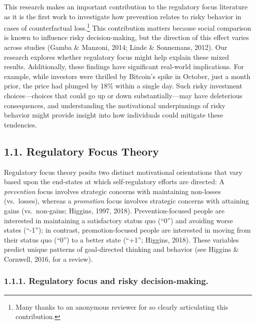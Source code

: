 \documentclass[man,floatsintext]{apa6}
\let\rmarkdownfootnote\footnote%
\def\footnote{\protect\rmarkdownfootnote}
\begin{document}
This research makes an important contribution to the regulatory focus literature as it is the first work to investigate how prevention relates to risky behavior in cases of counterfactual loss.\footnote{Many thanks to an anonymous reviewer for so clearly articulating this contribution.} This contribution matters because social comparison is known to influence risky decision-making, but the direction of this effect varies across studies (Gamba \& Manzoni, 2014; Linde \& Sonnemans, 2012). Our research explores whether regulatory focus might help explain these mixed results. Additionally, these findings have significant real-world implications. For example, while investors were thrilled by Bitcoin's spike in October, just a month prior, the price had plunged by 18\% within a single day. Such risky investment choices---choices that could go up or down substantially---may have deleterious consequences, and understanding the motivational underpinnings of risky behavior might provide insight into how individuals could mitigate these tendencies.

\hypertarget{regulatory-focus-theory}{%
\subsection{1.1. Regulatory Focus Theory}\label{regulatory-focus-theory}}

Regulatory focus theory posits two distinct motivational orientations that vary based upon the end-states at which self-regulatory efforts are directed: A \emph{prevention} focus involves strategic concerns with maintaining non-losses (vs.~losses), whereas a \emph{promotion} focus involves strategic concerns with attaining gains (vs.~non-gains; Higgins, 1997, 2018). Prevention-focused people are interested in maintaining a satisfactory status quo (\enquote{0}) and avoiding worse states (\enquote{-1}); in contrast, promotion-focused people are interested in moving from their status quo (\enquote{0}) to a better state (``+1''; Higgins, 2018). These variables predict unique patterns of goal-directed thinking and behavior (see Higgins \& Cornwell, 2016, for a review).

\hypertarget{regulatory-focus-and-risky-decision-making.}{%
\subsubsection{1.1.1. Regulatory focus and risky decision-making.}\label{regulatory-focus-and-risky-decision-making.}}
\end{document}
